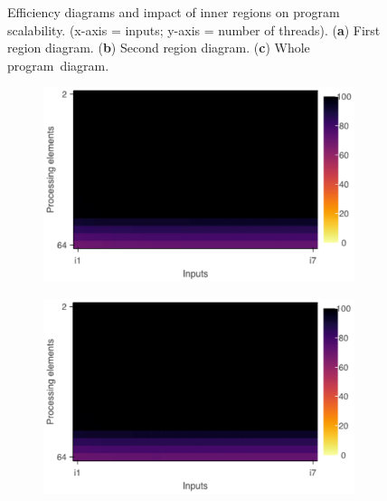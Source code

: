 \begin{figure}[H]
\begin{subfigure}[b]{0.45\textwidth}
		\caption{\centering}
		\label{fig:pv_regionscomparison_c}
	\end{subfigure}
	\caption{Efficiency diagrams and impact of inner regions on program scalability. (x-axis = inputs; y-axis = number of threads). (\textbf{a}) First region diagram. (\textbf{b}) Second region diagram. (\textbf{c}) Whole program~diagram.}
	\label{fig:pv_regionscomparison}
\end{figure}
\unskip
\begin{figure}[H]
	\begin{subfigure}[b]{0.45\textwidth}
		\includegraphics[width=\textwidth]{pascalanalyzer/figures/results/efficiency_rg_1.pdf}
		\caption{\centering}
		\label{fig:pv_regionscomparison_a_2}
	\end{subfigure}
	\begin{subfigure}[b]{0.45\textwidth}
		\includegraphics[width=\textwidth]{pascalanalyzer/figures/results/efficiency_rg_2.pdf}
		\caption{\centering}
		\label{fig:pv_regionscomparison_b_2}

\end{subfigure}
\end{figure}
